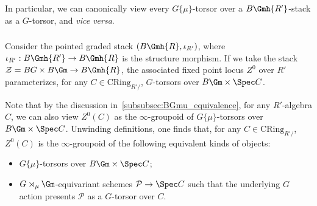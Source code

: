 \documentclass[10pt]{amsart}
\begin{document}
In particular, we can canonically view every $G\{\mu\}$-torsor over a $B\Gmh{R'}$-stack as a $G$-torsor, and \emph{vice versa}.

\subsubsection{}
\label{subsubsec:fixed_points_BG}
Consider the pointed graded stack $(B\Gmh{R},\iota_{R'})$, where $\iota_{R'}:B\Gmh{R'}\to B\Gmh{R}$ is the structure morphism. If we take the stack $\mathcal{Z} = BG\times B\Gm\to B\Gmh{R}$, the associated fixed point locus $Z^0$ over $R'$ parameterizes, for any $C\in \mathrm{CRing}_{R'/}$, $G$-torsors over $B\Gm\times \Spec C$. 

Note that by the discussion in~\eqref{subsubsec:BGmu_equivalence}, for any $R'$-algebra $C$, we can also view $Z^0(C)$ as the $\infty$-groupoid of $G\{\mu\}$-torsors over $B\Gm\times \Spec C$. Unwinding definitions, one finds that, for any $C\in \mathrm{CRing}_{R'/}$, $Z^0(C)$ is the $\infty$-groupoid of the following equivalent kinds of objects:
\begin{itemize}
   \item $G\{\mu\}$-torsors over $B\Gm\times\Spec C$;
   \item  $G\rtimes_\mu \Gm$-equivariant schemes $\mathcal{P}\to \Spec C$ such that the underlying $G$ action presents $\mathcal{P}$ as a $G$-torsor over $C$.
\end{itemize}
\end{document}
